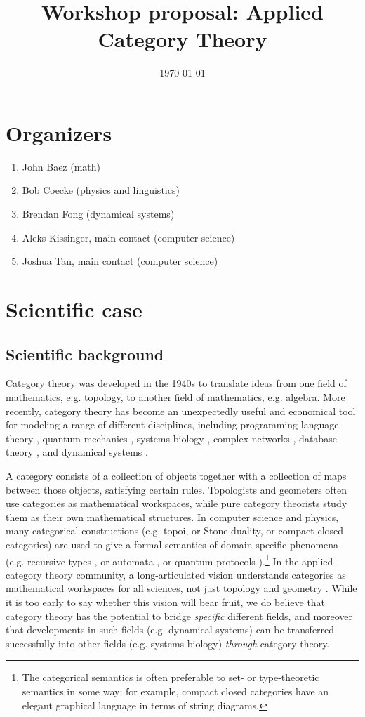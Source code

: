 \documentclass{article}
\title{Workshop proposal: Applied Category Theory}
\date{\today}
\begin{document}
\maketitle

\section{Organizers}
\begin{enumerate}
\item John Baez (math)
\item Bob Coecke (physics and linguistics) 
\item Brendan Fong (dynamical systems)
\item Aleks Kissinger, main contact (computer science)
\item Joshua Tan, main contact (computer science)
\end{enumerate}

\section{Scientific case}
\subsection{Scientific background}
Category theory was developed in the 1940s to translate ideas from one field of mathematics, e.g. topology, to another field of mathematics, e.g. algebra. More recently, category theory has become an unexpectedly useful and economical tool for modeling a range of different disciplines, including programming language theory \cite{abramsky}, quantum mechanics \cite{coecke}, systems biology \cite{cardelli}, complex networks \cite{baez}, database theory \cite{rosebrugh}, and dynamical systems \cite{spivak}.

A category consists of a collection of objects together with a collection of maps between those objects, satisfying certain rules. Topologists and geometers often use categories as mathematical workspaces, while pure category theorists study them as their own mathematical structures. In computer science and physics, many categorical constructions (e.g. topoi, or Stone duality, or compact closed categories) are used to give a formal semantics of domain-specific phenomena (e.g. recursive types \cite{simpson}, or automata \cite{pippenger}, or quantum protocols \cite{abramsky_coecke}).\footnote{The categorical semantics is often preferable to set- or type-theoretic semantics in some way: for example, compact closed categories have an elegant graphical language in terms of string diagrams.} In the applied category theory community, a long-articulated vision understands categories as mathematical workspaces for all sciences, not just topology and geometry \cite{spivak_book}. While it is too early to say whether this vision will bear fruit, we do believe that category theory has the potential to bridge \emph{specific} different fields, and moreover that developments in such fields (e.g. dynamical systems) can be transferred successfully into other fields (e.g. systems biology) \emph{through} category theory.
\end{document}
